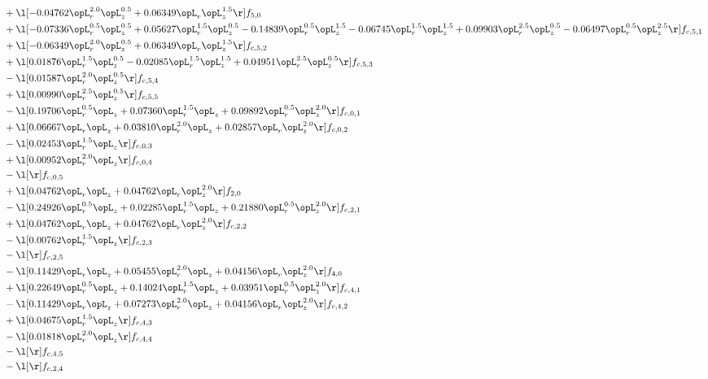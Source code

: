 \begin{alignat}{2}
& + \l[  -0.04762 \opL_r^{2.0} \opL_z^{0.5} +  0.06349 \opL_r \opL_z^{1.5}  \r] f_{5,0} \nonumber \\ 
& + \l[  -0.07336 \opL_r^{0.5} \opL_z^{0.5} +  0.05627 \opL_r^{1.5} \opL_z^{0.5}   -0.14839 \opL_r^{0.5} \opL_z^{1.5}   -0.06745 \opL_r^{1.5} \opL_z^{1.5} +  0.09903 \opL_r^{2.5} \opL_z^{0.5}   -0.06497 \opL_r^{0.5} \opL_z^{2.5}  \r] f_{c,5,1} \nonumber \\ 
& + \l[  -0.06349 \opL_r^{2.0} \opL_z^{0.5} +  0.06349 \opL_r \opL_z^{1.5}  \r] f_{c,5,2} \nonumber \\ 
& + \l[  0.01876 \opL_r^{1.5} \opL_z^{0.5}   -0.02085 \opL_r^{1.5} \opL_z^{1.5} +  0.04951 \opL_r^{2.5} \opL_z^{0.5}  \r] f_{c,5,3} \nonumber \\ 
& - \l[  0.01587 \opL_r^{2.0} \opL_z^{0.5}  \r] f_{c,5,4} \nonumber \\ 
& + \l[  0.00990 \opL_r^{2.5} \opL_z^{0.5}  \r] f_{c,5,5} \nonumber \\ 
& - \l[  0.19706 \opL_r^{0.5} \opL_z +  0.07360 \opL_r^{1.5} \opL_z +  0.09892 \opL_r^{0.5} \opL_z^{2.0}  \r] f_{c,0,1} \nonumber \\ 
& + \l[  0.06667 \opL_r \opL_z +  0.03810 \opL_r^{2.0} \opL_z +  0.02857 \opL_r \opL_z^{2.0}  \r] f_{c,0,2} \nonumber \\ 
& - \l[  0.02453 \opL_r^{1.5} \opL_z  \r] f_{c,0,3} \nonumber \\ 
& + \l[  0.00952 \opL_r^{2.0} \opL_z  \r] f_{c,0,4} \nonumber \\ 
& - \l[  \r] f_{c,0,5} \nonumber \\ 
& + \l[  0.04762 \opL_r \opL_z +  0.04762 \opL_r \opL_z^{2.0}  \r] f_{2,0} \nonumber \\ 
& - \l[  0.24926 \opL_r^{0.5} \opL_z +  0.02285 \opL_r^{1.5} \opL_z +  0.21880 \opL_r^{0.5} \opL_z^{2.0}  \r] f_{c,2,1} \nonumber \\ 
& + \l[  0.04762 \opL_r \opL_z +  0.04762 \opL_r \opL_z^{2.0}  \r] f_{c,2,2} \nonumber \\ 
& - \l[  0.00762 \opL_r^{1.5} \opL_z  \r] f_{c,2,3} \nonumber \\ 
& - \l[  \r] f_{c,2,5} \nonumber \\ 
& - \l[  0.11429 \opL_r \opL_z +  0.05455 \opL_r^{2.0} \opL_z +  0.04156 \opL_r \opL_z^{2.0}  \r] f_{4,0} \nonumber \\ 
& + \l[  0.22649 \opL_r^{0.5} \opL_z +  0.14024 \opL_r^{1.5} \opL_z +  0.03951 \opL_r^{0.5} \opL_z^{2.0}  \r] f_{c,4,1} \nonumber \\ 
& - \l[  0.11429 \opL_r \opL_z +  0.07273 \opL_r^{2.0} \opL_z +  0.04156 \opL_r \opL_z^{2.0}  \r] f_{c,4,2} \nonumber \\ 
& + \l[  0.04675 \opL_r^{1.5} \opL_z  \r] f_{c,4,3} \nonumber \\ 
& - \l[  0.01818 \opL_r^{2.0} \opL_z  \r] f_{c,4,4} \nonumber \\ 
& - \l[  \r] f_{c,4,5} \nonumber \\ 
& - \l[  \r] f_{c,2,4} \nonumber \\ 
\end{alignat} 


